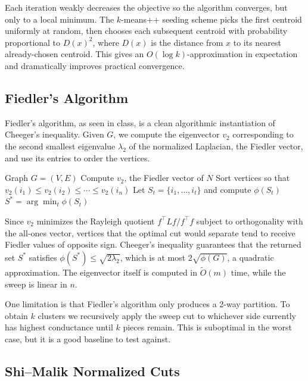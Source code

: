 \documentclass{article}
\theoremstyle{definition}
\theoremstyle{remark}
\begin{document}
Each iteration weakly decreases the objective so the algorithm converges, but only to a local minimum. The $k$-means++ seeding scheme picks the first centroid uniformly at random, then chooses each subsequent centroid with probability proportional to $D(x)^2$, where $D(x)$ is the distance from $x$ to its nearest already-chosen centroid. This gives an $O(\log k)$-approximation in expectation and dramatically improves practical convergence.

\subsection{Fiedler's Algorithm}

Fiedler's algorithm, as seen in class, is a clean algorithmic instantiation of Cheeger's inequality. Given $G$, we compute the eigenvector $v_2$ corresponding to the second smallest eigenvalue $\lambda_2$ of the normalized Laplacian, the Fiedler vector, and use its entries to order the vertices.

\begin{algorithm}[H]
\caption{Fiedler Sweep Cut}
\begin{algorithmic}[1]
\Require Graph $G = (V, E)$
\State Compute $v_2$, the Fiedler vector of $N$
\State Sort vertices so that $v_2(i_1) \le v_2(i_2) \le \cdots \le v_2(i_n)$
    \State Let $S_t = \{i_1, \ldots, i_t\}$ and compute $\phi(S_t)$
\EndFor
\State \Return $S^* = \arg\min_t \phi(S_t)$
\end{algorithmic}
\end{algorithm}

Since $v_2$ minimizes the Rayleigh quotient $f^\top L f / f^\top f$ subject to orthogonality with the all-ones vector, vertices that the optimal cut would separate tend to receive Fiedler values of opposite sign. Cheeger's inequality guarantees that the returned set $S^*$ satisfies $\phi(S^*) \le \sqrt{2 \lambda_2}$, which is at most $2\sqrt{\phi(G)}$, a quadratic approximation. The eigenvector itself is computed in $\tilde O(m)$ time, while the sweep is linear in $n$.

One limitation is that Fiedler's algorithm only produces a 2-way partition. To obtain $k$ clusters we recursively apply the sweep cut to whichever side currently has highest conductance until $k$ pieces remain. This is suboptimal in the worst case, but it is a good baseline to test against.

\subsection{Shi--Malik Normalized Cuts}
\end{document}
